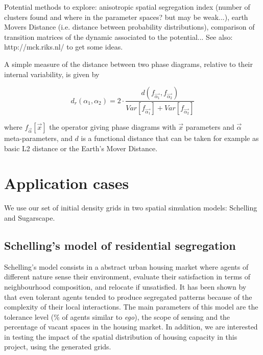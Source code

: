\documentclass[Afour,sageh,times]{sagej}
\begin{document}
Potential methods to explore: anisotropic spatial segregation index (number of clusters found and where in the parameter spaces? but may be weak...), earth Movers Distance (i.e. distance between probability distributions), comparison of transition matrices of the dynamic associated to the potential...
See also: http://mck.riks.nl/ to get some ideas.

A simple measure of the distance between two phase diagrams, relative to their internal variability, is given by

\[
d_r\left(\alpha_1,\alpha_2\right) = 2 \cdot \frac{d(f_{\vec{\alpha_1}},f_{\vec{\alpha_2}})}{Var\left[f_{\vec{\alpha_1}}\right] + Var\left[f_{\vec{\alpha_2}}\right]}
\]

where $f_{\vec{\alpha}}\left[\vec{x}\right]$ the operator giving phase diagrams with $\vec{x}$ parameters and $\vec{\alpha}$ meta-parameters, and $d$ is a functional distance that can be taken for example as basic L2 distance or the Earth's Mover Distance.




\section{Application cases}

We use our set of initial density grids in two spatial simulation models: Schelling and Sugarscape.


\subsection{Schelling's model of residential segregation}

Schelling's model consists in a abstract urban housing market where agents of different nature sense their environment, evaluate their satisfaction in terms of neighbourhood composition, and relocate if unsatisfied. It has been shown by \cite{Schelling1969} that even tolerant agents tended to produce segregated patterns because of the complexity of their local interactions. The main parameters of this model are the tolerance level (\% of agents similar to {\it ego}), the scope of sensing and the percentage of vacant spaces in the housing market. In addition, we are interested in testing the impact of the spatial distribution of housing capacity in this project, using the generated grids.
\end{document}
